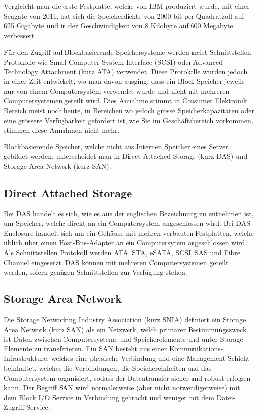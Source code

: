 Vergleicht man die erste Festplatte, welche von IBM produziert wurde, mit einer Seagate von 2011, hat sich die Speicherdichte von 2000 bit per Quadratzoll auf 625 Gigabyte und in der Geschwindigkeit von 8 Kilobyte auf 600 Megabyte verbessert\cite{Seagate2011}\cite{Seagate2011a}

Für den Zugriff auf Blockbasierende Speichersysteme werden meist Schnittstellen Protokolle wie Small Computer System Interface (SCSI) oder Advanced Technology Attachment (kurz \gls{ATA}) verwendet. Diese Protokolle wurden jedoch in einer Zeit entwickelt, wo man davon ausging, dass ein Block Speicher jeweils nur von einem Computersystem verwendet wurde und nicht mit mehreren Computersystemen geteilt wird. Dies Annahme stimmt in Consumer Elektronik Bereich meist noch heute, in Bereichen wo jedoch grosse Speicherkapazitäten oder eine grössere Verfügbarkeit gefordert ist, wie Sie im Geschäftsbereich vorkommen, stimmen diese Annahmen nicht mehr.

Blockbasierende Speicher, welche nicht aus Internen Speicher eines Server gebildet werden, unterscheidet man in Direct Attached Storage (kurz DAS) und Storage Area Network (kurz SAN). 

\subsection{Direct Attached Storage}
Bei DAS handelt es sich, wie es aus der englischen Bezeichnung zu entnehmen ist, um Speicher, welche direkt an ein Computersystem angeschlossen wird. Bei DAS Enclosure handelt sich um ein Gehäuse mit mehren verbauten Festplatten, welche üblich über einen Host-Bus-Adapter an ein Computersytem angeschlossen wird. Als Schnittstellen Protokoll werden \gls{ATA}, \gls{STA}, \gls{eSATA}, \gls{SCSI}, \gls{SAS} und Fibre Channel eingesetzt. DAS können mit mehreren Computersystemen geteilt werden, sofern genügen Schnittstellen zur Verfügung stehen.

\subsection{Storage Area Network}
Die Storage Networking Industry Association (kurz \gls{SNIA}) definiert ein Storage Area Network (kurz SAN) als ein Netzwerk, welch primärer Bestimmungszweck ist Daten zwischen Computersysteme und Speicherelemente und unter Storage Elemente zu transferieren. Ein SAN besteht aus einer Kommunikations-Infrastrukture, welches eine physische Verbindung und eine Management-Schicht beinhaltet, welches die Verbindungen, die Speichereinheiten und das Computersystem organisiert, sodass der Datentransfer sicher und robust erfolgen kann. Der Begriff SAN wird normalerweise (aber nicht notwendigerweise) mit dem Block I/O Service in Verbindung gebracht und weniger mit dem Datei-Zugriff-Service.\cite{SNIA2011}

